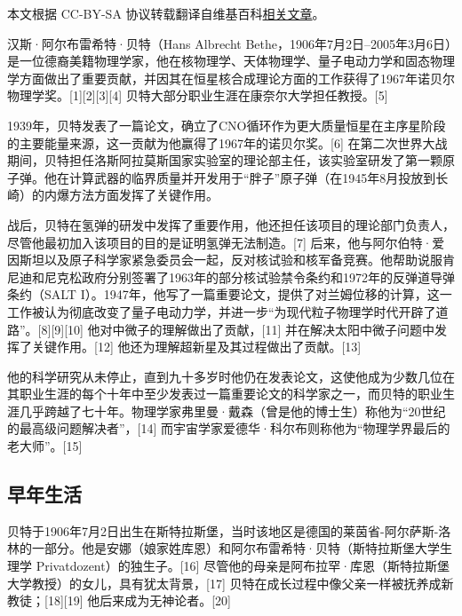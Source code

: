 
本文根据 CC-BY-SA 协议转载翻译自维基百科\href{https://en.wikipedia.org/wiki/Hans_Bethe#Honors_and_awards}{相关文章}。


汉斯·阿尔布雷希特·贝特（Hans Albrecht Bethe，1906年7月2日–2005年3月6日）是一位德裔美籍物理学家，他在核物理学、天体物理学、量子电动力学和固态物理学方面做出了重要贡献，并因其在恒星核合成理论方面的工作获得了1967年诺贝尔物理学奖。[1][2][3][4] 贝特大部分职业生涯在康奈尔大学担任教授。[5]

1939年，贝特发表了一篇论文，确立了CNO循环作为更大质量恒星在主序星阶段的主要能量来源，这一贡献为他赢得了1967年的诺贝尔奖。[6] 在第二次世界大战期间，贝特担任洛斯阿拉莫斯国家实验室的理论部主任，该实验室研发了第一颗原子弹。他在计算武器的临界质量并开发用于“胖子”原子弹（在1945年8月投放到长崎）的内爆方法方面发挥了关键作用。

战后，贝特在氢弹的研发中发挥了重要作用，他还担任该项目的理论部门负责人，尽管他最初加入该项目的目的是证明氢弹无法制造。[7] 后来，他与阿尔伯特·爱因斯坦以及原子科学家紧急委员会一起，反对核试验和核军备竞赛。他帮助说服肯尼迪和尼克松政府分别签署了1963年的部分核试验禁令条约和1972年的反弹道导弹条约（SALT I）。1947年，他写了一篇重要论文，提供了对兰姆位移的计算，这一工作被认为彻底改变了量子电动力学，并进一步“为现代粒子物理学时代开辟了道路”。[8][9][10] 他对中微子的理解做出了贡献，[11] 并在解决太阳中微子问题中发挥了关键作用。[12] 他还为理解超新星及其过程做出了贡献。[13]

他的科学研究从未停止，直到九十多岁时他仍在发表论文，这使他成为少数几位在其职业生涯的每个十年中至少发表过一篇重要论文的科学家之一，而贝特的职业生涯几乎跨越了七十年。物理学家弗里曼·戴森（曾是他的博士生）称他为“20世纪的最高级问题解决者”，[14] 而宇宙学家爱德华·科尔布则称他为“物理学界最后的老大师”。[15]
\subsection{早年生活}  
贝特于1906年7月2日出生在斯特拉斯堡，当时该地区是德国的莱茵省-阿尔萨斯-洛林的一部分。他是安娜（娘家姓库恩）和阿尔布雷希特·贝特（斯特拉斯堡大学生理学 Privatdozent）的独生子。[16] 尽管他的母亲是阿布拉罕·库恩（斯特拉斯堡大学教授）的女儿，具有犹太背景，[17] 贝特在成长过程中像父亲一样被抚养成新教徒；[18][19] 他后来成为无神论者。[20]